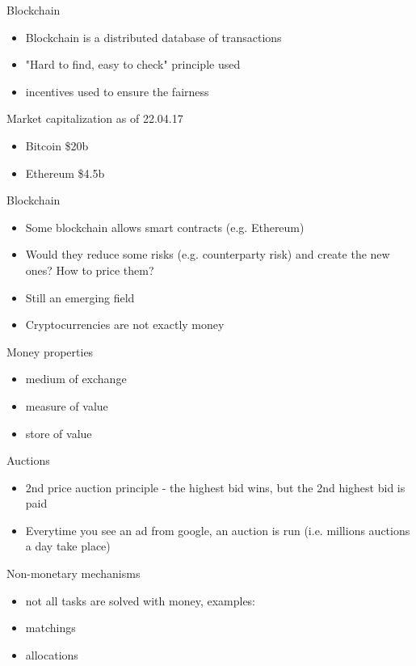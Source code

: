 \documentclass[presentation]{beamer}
\begin{document}
\begin{frame}[label=sec-3-18]{Blockchain}
\begin{itemize}
\item Blockchain is a distributed database of transactions
\item "Hard to find, easy to check" principle used
\item incentives used to ensure the fairness
\end{itemize}
\begin{block}{Market capitalization as of 22.04.17}
\begin{itemize}
\item Bitcoin \$20b
\item Ethereum \$4.5b
\end{itemize}
\end{block}
\end{frame}
\begin{frame}[label=sec-3-19]{Blockchain}
\begin{itemize}
\item Some blockchain allows smart contracts (e.g. Ethereum)
\item Would they reduce some risks (e.g. counterparty risk) and create the new ones? How to price them?
\item Still an emerging field
\item Cryptocurrencies are not exactly money
\end{itemize}
\begin{block}{Money properties}
\begin{itemize}
\item medium of exchange
\item measure of value
\item store of value
\end{itemize}
\end{block}
\end{frame}
\begin{frame}[label=sec-3-20]{Auctions}
\begin{itemize}
\item 2nd price auction principle - the highest bid wins, but the 2nd highest bid is paid
\item Everytime you see an ad from google, an auction is run (i.e. millions auctions a day take place)
\end{itemize}
\end{frame}
\begin{frame}[label=sec-3-21]{Non-monetary mechanisms}
\begin{itemize}
\item not all tasks are solved with money, examples:
\item matchings
\item allocations
\end{itemize}
\end{frame}
\end{document}
